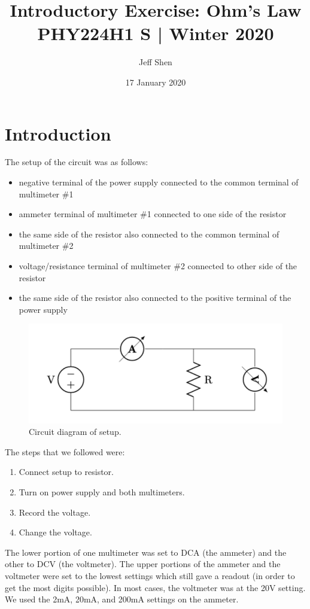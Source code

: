 \documentclass[11pt]{article}
\title{\vspace{-1cm}Introductory Exercise: Ohm's Law\\[0.4cm]\large{PHY224H1 S | Winter 2020}\vspace{-0.5em}}
\author{Jeff Shen}
\date{\vspace{-0.3em}\normalsize17 January 2020}
\begin{document}
\maketitle

\section{Introduction}

The setup of the circuit was as follows:
\begin{itemize}
    \item negative terminal of the power supply connected to the common terminal  of multimeter \#1
    \item ammeter terminal of multimeter \#1 connected to one side of the resistor
    \item the same side of the resistor also connected to the common terminal of multimeter \#2
    \item voltage/resistance terminal of multimeter \#2 connected to other side of the resistor
    \item the same side of the resistor also connected to the positive terminal of the power supply
\end{itemize}

\begin{figure}[htb]
    \centering 
    \includegraphics[width=0.5\linewidth]{circuit.png}
    \caption{\label{fig:circuit}Circuit diagram of setup.}
\end{figure}

The steps that we followed were:
\begin{enumerate}
    \item Connect setup to resistor.
    \item Turn on power supply and both multimeters.
    \item Record the voltage. 
    \item Change the voltage. 
\end{enumerate}

The lower portion of one multimeter was set to DCA (the ammeter) and the other to DCV (the voltmeter). The upper portions of the ammeter and the voltmeter were set to the lowest settings which still gave a readout (in order to get the most digits possible). In most cases, the voltmeter was at the 20V setting. We used the 2mA, 20mA, and 200mA settings on the ammeter. 
\end{document}
